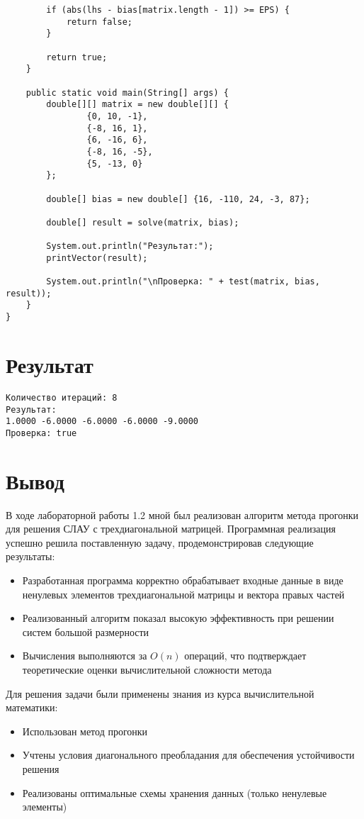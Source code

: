 \begin{verbatim}
        if (abs(lhs - bias[matrix.length - 1]) >= EPS) {
            return false;
        }

        return true;
    }

    public static void main(String[] args) {
        double[][] matrix = new double[][] {
                {0, 10, -1},
                {-8, 16, 1},
                {6, -16, 6},
                {-8, 16, -5},
                {5, -13, 0}
        };

        double[] bias = new double[] {16, -110, 24, -3, 87};

        double[] result = solve(matrix, bias);

        System.out.println("Результат:");
        printVector(result);

        System.out.println("\nПроверка: " + test(matrix, bias, result));
    }
}
\end{verbatim}

\section*{Результат}

\begin{verbatim}
Количество итераций: 8
Результат:
1.0000 -6.0000 -6.0000 -6.0000 -9.0000 
Проверка: true
\end{verbatim}

\section*{Вывод}

В ходе лабораторной работы 1.2 мной был реализован алгоритм метода прогонки для решения СЛАУ 
с трехдиагональной матрицей. Программная реализация успешно решила поставленную задачу, 
продемонстрировав следующие результаты:

\begin{itemize}
\item Разработанная программа корректно обрабатывает входные данные в виде ненулевых элементов трехдиагональной матрицы и вектора правых частей
\item Реализованный алгоритм показал высокую эффективность при решении систем большой размерности
\item Вычисления выполняются за $O(n)$ операций, что подтверждает теоретические оценки вычислительной сложности метода
\end{itemize}

Для решения задачи были применены знания из курса вычислительной математики:
\begin{itemize}
\item Использован метод прогонки
\item Учтены условия диагонального преобладания для обеспечения устойчивости решения
\item Реализованы оптимальные схемы хранения данных (только ненулевые элементы)
\end{itemize}

